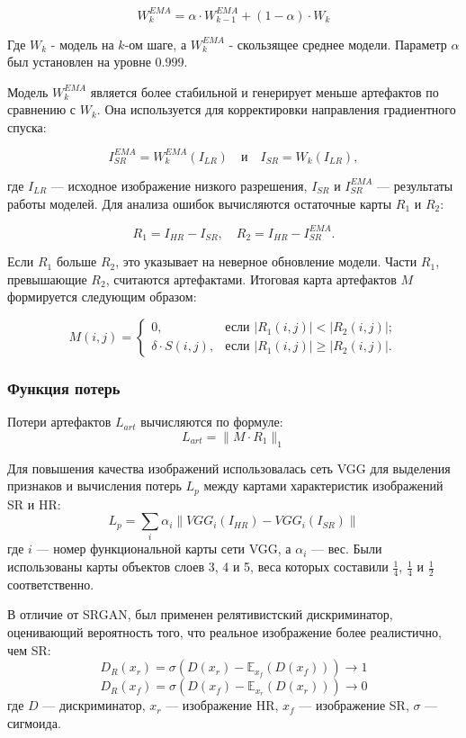 \documentclass[14pt]{extarticle}
\begin{document}
$$
W_k^{EMA} = \alpha \cdot W_{k-1}^{EMA} + (1 - \alpha) \cdot W_k
$$

Где $W_k$ - модель на $k$-ом шаге, а $W_k^{EMA}$ - скользящее среднее модели. Параметр $\alpha$ был установлен на уровне $0.999$.


Модель $W_k^{EMA}$ является более стабильной и генерирует меньше артефактов по сравнению с $W_k$. Она используется для корректировки направления градиентного спуска:

\[
I_{SR}^{EMA} = W_k^{EMA}(I_{LR}) \quad \text{и} \quad I_{SR} = W_k(I_{LR}),
\]

где $I_{LR}$ — исходное изображение низкого разрешения, $I_{SR}$ и $I_{SR}^{EMA}$ — результаты работы моделей. Для анализа ошибок вычисляются остаточные карты $R_1$ и $R_2$:

\[
R_1 = I_{HR} - I_{SR}, \quad R_2 = I_{HR} - I_{SR}^{EMA}.
\]

Если $R_1$ больше $R_2$, это указывает на неверное обновление модели. Части $R_1$, превышающие $R_2$, считаются артефактами. Итоговая карта артефактов $M$ формируется следующим образом:

$$
M(i,j) =
  \begin{cases}
    0, & \text{если } |R_1(i,j)| < |R_2(i,j)|; \\
    \delta \cdot S(i,j), & \text{если } |R_1(i,j)| \geq |R_2(i,j)|.
  \end{cases}
$$

\subsubsection{Функция потерь}
Потери артефактов $L_{art}$ вычисляются по формуле:
$$
L_{art} = \|M \cdot R_1\|_1
$$

Для повышения качества изображений использовалась сеть VGG для выделения признаков и вычисления потерь $L_p$ между картами характеристик изображений SR и HR:
$$
L_p = \sum_i \alpha_i \| VGG_i(I_{HR}) - VGG_i(I_{SR}) \|
$$
где $i$ — номер функциональной карты сети VGG, а $\alpha_i$ — вес. Были использованы карты объектов слоев 3, 4 и 5, веса которых составили $\frac{1}{4}$, $\frac{1}{4}$ и $\frac{1}{2}$ соответственно.

В отличие от SRGAN, был применен релятивистский дискриминатор, оценивающий вероятность того, что реальное изображение более реалистично, чем SR:
$$
D_R(x_r) = \sigma(D(x_r) - \mathbb{E}_{x_f}(D(x_f))) \rightarrow 1
$$
$$
D_R(x_f) = \sigma(D(x_f) - \mathbb{E}_{x_r}(D(x_r))) \rightarrow 0
$$
где $D$ — дискриминатор, $x_r$ — изображение HR, $x_f$ — изображение SR, $\sigma$ — сигмоида.
\end{document}
